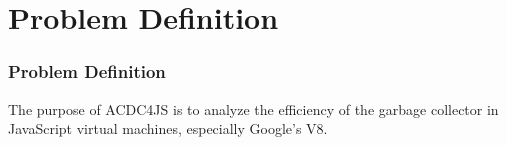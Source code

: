 %
%
\section{Problem Definition} 
\begin{frame}
	\frametitle{Problem Definition}
	The purpose of ACDC4JS is to analyze the efficiency of the garbage collector in JavaScript virtual machines, especially Google's V8.
\end{frame}